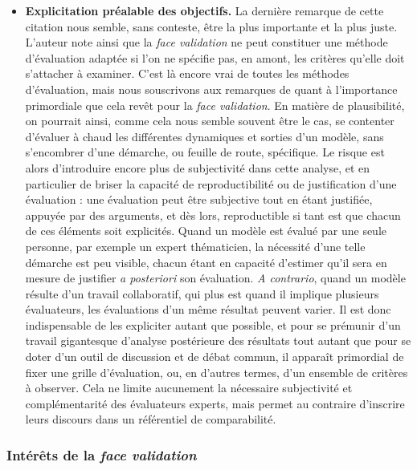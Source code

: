 \begin{itemize}
	\item \textbf{Explicitation préalable des objectifs.}
	La dernière remarque de cette citation nous semble, sans conteste, être la plus importante et la plus juste.
	L'auteur note ainsi que la \textit{face validation} ne peut constituer une méthode d'évaluation adaptée si l'on ne spécifie pas, en amont, les critères qu'elle doit s'attacher à examiner.
	C'est là encore vrai de toutes les méthodes d'évaluation, mais nous souscrivons aux remarques de \citeauthor{hermann_validation_1967} quant à l'importance primordiale que cela revêt pour la \textit{face validation}.
	En matière de plausibilité, on pourrait ainsi, comme cela nous semble souvent être le cas, se contenter d'évaluer \og à chaud\fg{} les différentes dynamiques et sorties d'un modèle, sans s'encombrer d'une démarche, ou feuille de route, spécifique.
	Le risque est alors d'introduire encore plus de subjectivité dans cette analyse, et en particulier de briser la capacité de reproductibilité ou de justification d'une évaluation :
	une évaluation peut être subjective tout en étant justifiée, appuyée par des arguments, et dès lors, reproductible si tant est que chacun de ces éléments soit explicités.
	Quand un modèle est évalué par une seule personne, par exemple un expert thématicien, la nécessité d'une telle démarche est peu visible, chacun étant en capacité d'estimer qu'il sera en mesure de justifier \textit{a posteriori} son évaluation.
	\textit{A contrario}, quand un modèle résulte d'un travail collaboratif, qui plus est quand il implique plusieurs évaluateurs, les évaluations d'un même résultat peuvent varier.
	Il est donc indispensable de les expliciter autant que possible, et pour se prémunir d'un travail gigantesque d'analyse postérieure des résultats tout autant que pour se doter d'un outil de discussion et de débat commun, il apparaît primordial de fixer une grille d'évaluation, ou, en d'autres termes, d'un ensemble de critères à observer.
	Cela ne limite aucunement la nécessaire subjectivité et complémentarité des évaluateurs experts, mais permet au contraire d'inscrire leurs discours dans un référentiel de comparabilité.
	
\end{itemize}

\subsubsection{Intérêts de la \textit{face validation} \label{subsubsec:interets-face-validation}}

